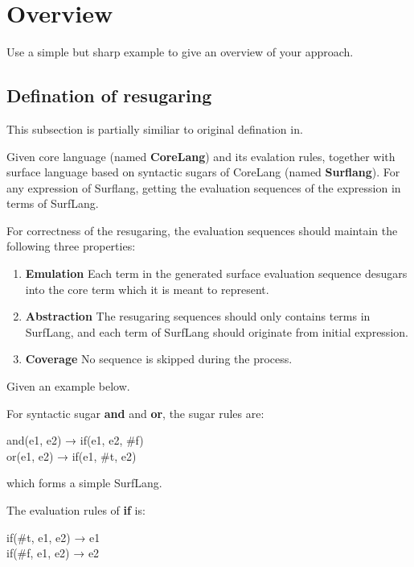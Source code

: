 \section{Overview}
\label{sec2}

Use a simple but sharp example to give an overview of your approach.

\subsection{Defination of resugaring}
This subsection is partially similiar to original defination in\cite{resugaring}.
\begin{Def}[Resugaring]
Given core language (named {\bfseries CoreLang}) and its evalation rules, together with surface language based on syntactic sugars of CoreLang (named {\bfseries Surflang}). For any expression of Surflang, getting the evaluation sequences of the expression in terms of SurfLang. 
\end{Def}
For correctness of the resugaring, the evaluation sequences should maintain the following three properties:
\begin{enumerate}
\item {\bfseries Emulation} Each term in the generated surface evaluation sequence desugars into the core term which it is meant to represent.
\item {\bfseries Abstraction} The resugaring sequences should only contains terms in SurfLang, and each term of SurfLang should originate from initial expression.
\item {\bfseries Coverage} No sequence is skipped during the process.
\end{enumerate}

Given an example below.

For syntactic sugar {\bfseries and} and {\bfseries or}, the sugar rules are:
\begin{center}
	\parbox[t]{\textwidth}{%
		\begin{center}  
			and(e1, e2) → if(e1, e2, \#f)\\
			or(e1, e2) → if(e1, \#t, e2)
		\end{center}  
	}%
\end{center}
which forms a simple SurfLang.

The evaluation rules of {\bfseries if} is:
\begin{center}
	\parbox[t]{\textwidth}{%
		\begin{center}  
			if(\#t, e1, e2) → e1\\
			if(\#f, e1, e2) → e2
		\end{center}  
	}%
\end{center}

